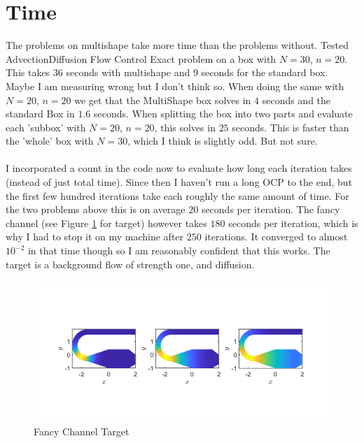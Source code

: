 \documentclass[11pt, a4paper]{article}
\theoremstyle{definition}
\begin{document}
    \section{Time}
    The problems on multishape take more time than the problems without. Tested AdvectionDiffusion Flow Control Exact problem on a box with $N = 30$, $n = 20$. This takes $36$ seconds with multishape and $9$ seconds for the standard box. Maybe I am measuring wrong but I don't think so.
    When doing the same with $N = 20$, $n = 20$ we get that the MultiShape box solves in $4$ seconds and the standard Box in $1.6$ seconds. 
    When splitting the box into two parts and evaluate each 'subbox' with $N = 20$, $n = 20$, this solves in $25$ seconds. This is faster than the 'whole' box with $N = 30$, which I think is slightly odd. But not sure. 
    \\
    \\
    I incorporated a count in the code now to evaluate how long each iteration takes (instead of just total time). Since then I haven't run a long OCP to the end, but the first few hundred iterations take each roughly the same amount of time.
    For the two problems above this is on average $20$ seconds per iteration.
    The fancy channel (see Figure \ref{FFCFW} for target) however takes $180$ seconds per iteration, which is why I had to stop it on my machine after $250$ iterations. It converged to almost $10^{-2}$ in that time though so I am reasonably confident that this works. The target is a background flow of strength one, and diffusion.
    \begin{figure}[h]
    	\centering
    	\includegraphics[scale=0.3]{FancyChannelFW.png}
    	\caption{Fancy Channel Target} 
    	\label{FFCFW}
    \end{figure}
\end{document}
